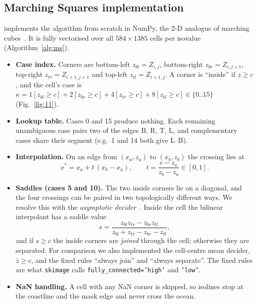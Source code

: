 \subsection{Marching Squares implementation}
 implements the algorithm from scratch in NumPy, the 2-D analogue of marching
cubes~\cite{lorensen1987}. It is fully vectorised over all $584\times1385$ cells per isovalue (Algorithm~\ref{alg:ms}).
\begin{itemize}
\item \textbf{Case index.} Corners are bottom-left $z_{bl}=Z_{i,j}$, bottom-right $z_{br}=Z_{i,j+1}$, top-right
  $z_{tr}=Z_{i+1,j+1}$ and top-left $z_{tl}=Z_{i+1,j}$. A corner is ``inside'' if $z\ge c$, and the cell's case is
  $\kappa=1[z_{bl}{\ge}c]+2[z_{br}{\ge}c]+4[z_{tr}{\ge}c]+8[z_{tl}{\ge}c]\in\{0..15\}$ (Fig.~\ref{fig:11}).
\item \textbf{Lookup table.} Cases 0 and 15 produce nothing. Each remaining unambiguous case pairs two of the edges
  B, R, T, L, and complementary cases share their segment (e.g.\ 1 and 14 both give L--B).
\item \textbf{Interpolation.} On an edge from $(x_a,z_a)$ to $(x_b,z_b)$ the crossing lies at
  \begin{equation}
  x^\ast = x_a + t\,(x_b-x_a),\qquad t=\frac{c-z_a}{z_b-z_a}\in[0,1].
  \end{equation}
\item \textbf{Saddles (cases 5 and 10).} The two inside corners lie on a diagonal, and the four crossings can be paired
  in two topologically different ways. We resolve this with the \emph{asymptotic decider}~\cite{nielson1991}. Inside the
  cell the bilinear interpolant has a saddle value
  \begin{equation}
  s=\frac{z_{bl}z_{tr}-z_{br}z_{tl}}{z_{bl}+z_{tr}-z_{br}-z_{tl}},
  \label{eq:asym}
  \end{equation}
  and if $s\ge c$ the inside corners are \emph{joined} through the cell; otherwise they are separated. For comparison we also
  implemented the cell-centre mean decider, $\bar z\ge c$, and the fixed rules ``always join'' and ``always separate''.
  The fixed rules are what \texttt{skimage} calls \texttt{fully\_connected='high'} and \texttt{'low'}.
\item \textbf{NaN handling.} A cell with any NaN corner is skipped, so isolines stop at the coastline and the mask edge
  and never cross the ocean.
\end{itemize}

